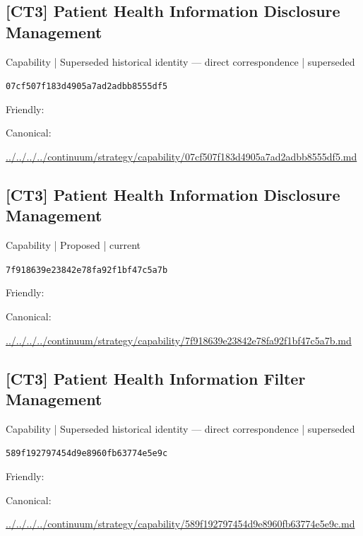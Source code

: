 \documentclass[10pt,a4paper]{article}
\begin{document}
\subsection*{[CT3] Patient Health Information Disclosure Management}
{\small Capability | Superseded historical identity — direct correspondence | superseded}\par
\texttt{07cf507f183d4905a7ad2adbb8555df5}\par
Friendly: \par
Canonical: \par
{\footnotesize\url{../../../../continuum/strategy/capability/07cf507f183d4905a7ad2adbb8555df5.md}}\par
\subsection*{[CT3] Patient Health Information Disclosure Management}
{\small Capability | Proposed | current}\par
\texttt{7f918639e23842e78fa92f1bf47c5a7b}\par
Friendly: \par
Canonical: \par
{\footnotesize\url{../../../../continuum/strategy/capability/7f918639e23842e78fa92f1bf47c5a7b.md}}\par
\subsection*{[CT3] Patient Health Information Filter Management}
{\small Capability | Superseded historical identity — direct correspondence | superseded}\par
\texttt{589f192797454d9e8960fb63774e5e9c}\par
Friendly: \par
Canonical: \par
{\footnotesize\url{../../../../continuum/strategy/capability/589f192797454d9e8960fb63774e5e9c.md}}\par
\end{document}
